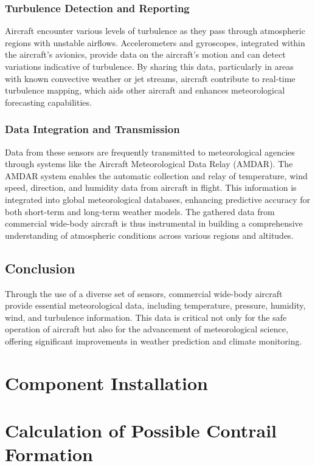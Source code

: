 \documentclass[a4paper, 12pt]{report}
\begin{document}
\subsection{Turbulence Detection and Reporting}
Aircraft encounter various levels of turbulence as they pass through atmospheric regions with unstable airflows. Accelerometers and gyroscopes, integrated within the aircraft’s avionics, provide data on the aircraft's motion and can detect variations indicative of turbulence. By sharing this data, particularly in areas with known convective weather or jet streams, aircraft contribute to real-time turbulence mapping, which aids other aircraft and enhances meteorological forecasting capabilities.

\subsection{Data Integration and Transmission}
Data from these sensors are frequently transmitted to meteorological agencies through systems like the Aircraft Meteorological Data Relay (AMDAR). The AMDAR system enables the automatic collection and relay of temperature, wind speed, direction, and humidity data from aircraft in flight. This information is integrated into global meteorological databases, enhancing predictive accuracy for both short-term and long-term weather models. The gathered data from commercial wide-body aircraft is thus instrumental in building a comprehensive understanding of atmospheric conditions across various regions and altitudes.

\section{Conclusion}
Through the use of a diverse set of sensors, commercial wide-body aircraft provide essential meteorological data, including temperature, pressure, humidity, wind, and turbulence information. This data is critical not only for the safe operation of aircraft but also for the advancement of meteorological science, offering significant improvements in weather prediction and climate monitoring.

\chapter{Component Installation}

\chapter{Calculation of Possible Contrail Formation}
\end{document}
